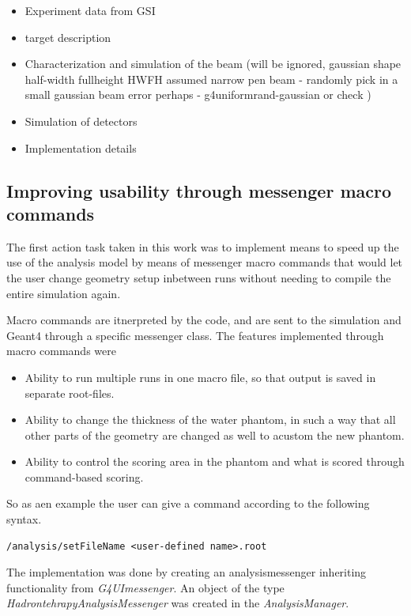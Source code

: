 
\begin{itemize}
\item Experiment data from GSI
\item target description
\item Characterization and simulation of the beam (will be ignored, gaussian shape half-width fullheight HWFH assumed narrow pen beam - randomly pick in a small gaussian beam error perhaps - g4uniformrand-gaussian or check )
\item Simulation of detectors
\item Implementation details
\end{itemize}

\subsection{Improving usability through messenger macro commands}
The first action task taken in this work was to implement means to speed up the use of the analysis model by means of messenger macro commands that would let the user change geometry setup inbetween runs without needing to compile the entire simulation again.

Macro commands are itnerpreted by the code, and are sent to the simulation and Geant4 through a specific messenger class. The features implemented through macro commands were
\begin{itemize}
 \item Ability to run multiple runs in one macro file, so that output is saved in separate root-files.
\item Ability to change the thickness of the water phantom, in such a way that all other parts of the geometry are changed as well to acustom the new phantom.
\item Ability to control the scoring area in the phantom and what is scored through command-based scoring.
\end{itemize}


So as aen example the user can give a command according to the following syntax.
\scriptsize
\begin{verbatim}
/analysis/setFileName <user-defined name>.root
\end{verbatim}
\normalsize

The implementation was done by creating an analysismessenger inheriting functionality from \textit{G4UImessenger}. An object of the type \textit{HadrontehrapyAnalysisMessenger} was created in the \textit{AnalysisManager}.


